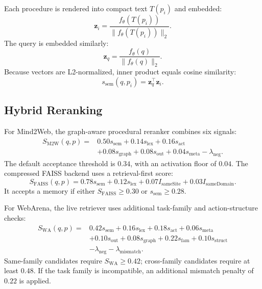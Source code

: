 \documentclass[11pt]{article}
\newcommand{\vect}[1]{\mathbf{#1}}
\begin{document}
Each procedure is rendered into compact text $T(p_i)$ and embedded:
\begin{equation}
  \vect{z}_i = \frac{f_\theta(T(p_i))}{\|f_\theta(T(p_i))\|_2}.
\end{equation}
The query is embedded similarly:
\begin{equation}
  \vect{z}_q = \frac{f_\theta(q)}{\|f_\theta(q)\|_2}.
\end{equation}
Because vectors are L2-normalized, inner product equals cosine similarity:
\begin{equation}
  s_{\mathrm{sem}}(q,p_i)=\vect{z}_q^\top \vect{z}_i.
\end{equation}

\subsection{Hybrid Reranking}

For Mind2Web, the graph-aware procedural reranker combines six signals:
\begin{equation}
\begin{aligned}
  S_{\mathrm{M2W}}(q,p) =
  &0.50s_{\mathrm{sem}} + 0.14s_{\mathrm{lex}} + 0.16s_{\mathrm{act}} \\
  &+0.08s_{\mathrm{graph}} + 0.08s_{\mathrm{out}} + 0.04s_{\mathrm{meta}} - \lambda_{\mathrm{neg}}.
\end{aligned}
\end{equation}
The default acceptance threshold is $0.34$, with an activation floor of $0.04$. The compressed FAISS backend uses a retrieval-first score:
\begin{equation}
  S_{\mathrm{FAISS}}(q,p)=0.78s_{\mathrm{sem}}+0.12s_{\mathrm{lex}}+0.07I_{\mathrm{sameSite}}+0.03I_{\mathrm{sameDomain}}.
\end{equation}
It accepts a memory if either $S_{\mathrm{FAISS}}\ge 0.30$ or $s_{\mathrm{sem}}\ge 0.28$.

For WebArena, the live retriever uses additional task-family and action-structure checks:
\begin{equation}
\begin{aligned}
  S_{\mathrm{WA}}(q,p) =
  &0.42s_{\mathrm{sem}} + 0.16s_{\mathrm{lex}} + 0.18s_{\mathrm{act}}
   +0.06s_{\mathrm{meta}} \\
  &+0.10s_{\mathrm{out}} +0.08s_{\mathrm{graph}}
   +0.22s_{\mathrm{fam}}+0.10s_{\mathrm{struct}} \\
  &-\lambda_{\mathrm{neg}}-\lambda_{\mathrm{mismatch}}.
\end{aligned}
\end{equation}
Same-family candidates require $S_{\mathrm{WA}}\ge0.42$; cross-family candidates require at least $0.48$. If the task family is incompatible, an additional mismatch penalty of $0.22$ is applied.
\end{document}
